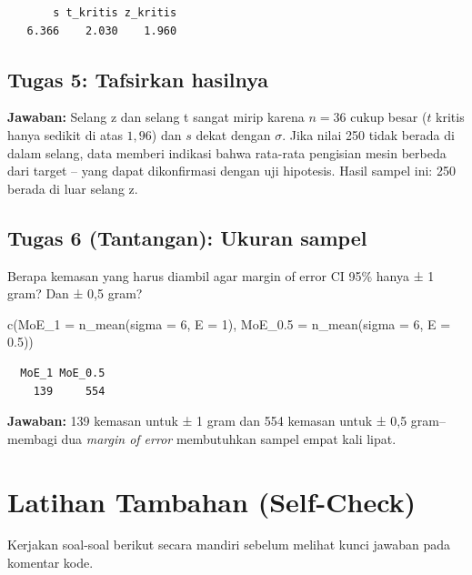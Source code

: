 \documentclass[
  indonesian,
  letterpaper,
]{book}
\newenvironment{Shaded}{\begin{snugshade}}{\end{snugshade}}
\newcommand{\AttributeTok}[1]{\textcolor[rgb]{0.40,0.45,0.13}{#1}}
\newcommand{\DecValTok}[1]{\textcolor[rgb]{0.68,0.00,0.00}{#1}}
\newcommand{\FloatTok}[1]{\textcolor[rgb]{0.68,0.00,0.00}{#1}}
\newcommand{\FunctionTok}[1]{\textcolor[rgb]{0.28,0.35,0.67}{#1}}
\newcommand{\NormalTok}[1]{\textcolor[rgb]{0.00,0.23,0.31}{#1}}
\begin{document}
\begin{verbatim}
       s t_kritis z_kritis 
   6.366    2.030    1.960 
\end{verbatim}

\subsection{Tugas 5: Tafsirkan
hasilnya}\label{tugas-5-tafsirkan-hasilnya}

\textbf{Jawaban:} Selang z dan selang t sangat mirip karena \(n = 36\)
cukup besar (\(t\) kritis hanya sedikit di atas \(1,96\)) dan \(s\)
dekat dengan \(\sigma\). Jika nilai 250 tidak berada di dalam selang,
data memberi indikasi bahwa rata-rata pengisian mesin berbeda dari
target -- yang dapat dikonfirmasi dengan uji hipotesis. Hasil sampel
ini: 250 berada di luar selang z.

\subsection{Tugas 6 (Tantangan): Ukuran
sampel}\label{tugas-6-tantangan-ukuran-sampel}

Berapa kemasan yang harus diambil agar margin of error CI 95\% hanya ± 1
gram? Dan ± 0,5 gram?

\begin{Shaded}
\begin{Highlighting}[]
\FunctionTok{c}\NormalTok{(}\AttributeTok{MoE\_1 =} \FunctionTok{n\_mean}\NormalTok{(}\AttributeTok{sigma =} \DecValTok{6}\NormalTok{, }\AttributeTok{E =} \DecValTok{1}\NormalTok{), }\AttributeTok{MoE\_0.5 =} \FunctionTok{n\_mean}\NormalTok{(}\AttributeTok{sigma =} \DecValTok{6}\NormalTok{, }\AttributeTok{E =} \FloatTok{0.5}\NormalTok{))}
\end{Highlighting}
\end{Shaded}

\begin{verbatim}
  MoE_1 MoE_0.5 
    139     554 
\end{verbatim}

\textbf{Jawaban:} 139 kemasan untuk ± 1 gram dan 554 kemasan untuk ± 0,5
gram-- membagi dua \emph{margin of error} membutuhkan sampel empat kali
lipat.

\section{Latihan Tambahan
(Self-Check)}\label{latihan-tambahan-self-check}

Kerjakan soal-soal berikut secara mandiri sebelum melihat kunci jawaban
pada komentar kode.
\end{document}
